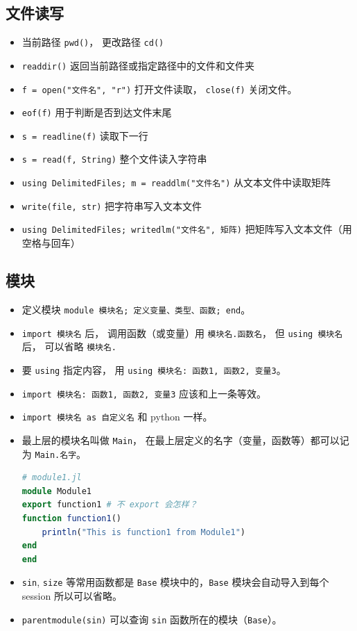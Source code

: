 \subsection{文件读写}
\begin{itemize}
\item 当前路径 \verb`pwd()`， 更改路径 \verb`cd()`
\item \verb`readdir()` 返回当前路径或指定路径中的文件和文件夹
\item \verb`f = open("文件名", "r")` 打开文件读取， \verb`close(f)` 关闭文件。
\item \verb`eof(f)` 用于判断是否到达文件末尾
\item \verb`s = readline(f)` 读取下一行
\item \verb`s = read(f, String)` 整个文件读入字符串
\item \verb`using DelimitedFiles; m = readdlm("文件名")` 从文本文件中读取矩阵
\item \verb`write(file, str)` 把字符串写入文本文件
\item \verb`using DelimitedFiles; writedlm("文件名", 矩阵)` 把矩阵写入文本文件（用空格与回车）
\end{itemize}


\subsection{模块}
\begin{itemize}
\item 定义模块 \verb`module 模块名; 定义变量、类型、函数; end`。
\item \verb`import 模块名` 后， 调用函数（或变量）用 \verb`模块名.函数名`， 但 \verb`using 模块名` 后， 可以省略 \verb`模块名.`
\item 要 \verb`using` 指定内容， 用 \verb`using 模块名: 函数1, 函数2, 变量3`。
\item \verb`import 模块名: 函数1, 函数2, 变量3` 应该和上一条等效。
\item \verb`import 模块名 as 自定义名` 和 python 一样。
\item 最上层的模块名叫做 \verb`Main`， 在最上层定义的名字（变量，函数等）都可以记为 \verb`Main.名字`。
\begin{lstlisting}[language=julia]
# module1.jl
module Module1
export function1 # 不 export 会怎样？
function function1()
    println("This is function1 from Module1")
end
end
\end{lstlisting}
\item \verb`sin`, \verb`size` 等常用函数都是 \verb`Base` 模块中的，\verb`Base` 模块会自动导入到每个 session 所以可以省略。
\item \verb`parentmodule(sin)` 可以查询 \verb`sin` 函数所在的模块（\verb`Base`）。
\end{itemize}



